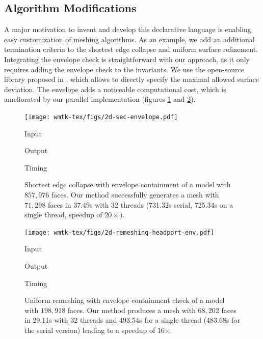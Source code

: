 \subsection{Algorithm Modifications}

A major motivation to invent and develop this declarative language is enabling easy customization of meshing algorithms. As an example, we add an additional termination criteria to the shortest edge collapse and uniform surface refinement.  Integrating the envelope check is straightforward with our approach, as it only requires adding the envelope check to the invariants. We use the open-source library proposed in \cite{Wang:2020:FE}, which allows to directly specify the maximal allowed surface deviation. The envelope adds a noticeable computational cost, which is ameliorated by our parallel implementation (figures \ref{fig:decimate_envelope} and \ref{fig:uniform_envelope}). 

\begin{figure}
    \centering\footnotesize
    \texttt{[image: wmtk-tex/figs/2d-sec-envelope.pdf]}
    \parbox{.3\linewidth}{\centering Input}\hfill
    \parbox{.3\linewidth}{\centering Output}\hfill
    \parbox{.3\linewidth}{\centering Timing}\par
    \caption{Shortest edge collapse with envelope containment of a model with $857,976$ faces. {Our method successfully generates a mesh with $71,298$ faces in 37.49s with 32 threads (731.32s serial, 725.34s on a single thread, speedup of $20\times$).}}
    \label{fig:decimate_envelope}
    
    
\end{figure}


\begin{figure}
    \centering\footnotesize
    \texttt{[image: wmtk-tex/figs/2d-remeshing-headport-env.pdf]}
    \parbox{.3\linewidth}{\centering Input}\hfill
    \parbox{.3\linewidth}{\centering Output}\hfill
    \parbox{.3\linewidth}{\centering Timing}\par
    \caption{Uniform remeshing with envelope containment check of a model with $198,918$ faces. {Our method produces a mesh with $68,202$ faces in 29.11s with 32 threads and 493.54s for a single thread (483.68s for the serial version) leading to a speedup of 16$\times$.}}
    \label{fig:uniform_envelope}
    

\end{figure}




